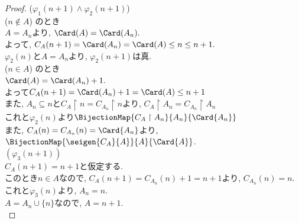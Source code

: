 \begin{proof}
 ($\varphi_1(n+1) \land \varphi_2(n+1)$)\\
 ($n \not\in A$) のとき\\
 $A=A_n$より,
 $\Card(A) = \Card(A_n).$\\
 よって,
 $C_A(n+1) = \Card(A_n) = \Card(A) \leq n \leq n+1.$\\
 $\varphi_2 (n)$と$A=A_n$より,
 $\varphi_2 (n+1)$は真.\\
 ($n \in A$) のとき\\
 $\Card(A) = \Card(A_n) + 1.$\\
 よって$C_A(n+1) = \Card(A_n) + 1 = \Card(A) \leq n+1$\\
 また,
 $A_n \subseteq n$と$C_A \restriction {n} = C_{A_n} \restriction {n}$より,
 $C_A \restriction {A_n} = C_{A_n} \restriction {A_n}$\\
 これと$\varphi_2(n)$より$\BijectionMap {C_A\restriction {A_n}}{A_n}{\Card{A_n}}$\\
 また,
 $C_A(n) = C_{A_n}(n) = \Card{A_n}$より,
 $\BijectionMap {\seigen {C_A}{A}}{A}{\Card{A}}$.\\
 
 $(\varphi_3(n+1))$\\
 $C_{A}(n+1)=n+1$と仮定する.\\
 このとき$n \in A$なので,
 $C_A(n+1) = C_{A_n}(n) + 1 = n + 1$より,
 $C_{A_n}(n) = n$.\\
 これと$\varphi_3(n)$より,
 $A_n = n$.\\
 $A = A_n \cup \{n\}$なので,
 $A = n+1$.\\
\end{proof}
